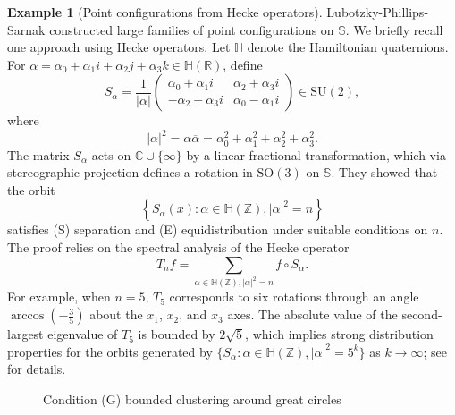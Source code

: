 \documentclass[12pt,reqno]{amsart}
\newcommand{\C}{\mathbb{C}}
\newcommand{\Hb}{\mathbb{H}}
\newcommand{\ol}{\overline}
\newcommand{\R}{\mathbb{R}}
\newcommand{\Sb}{\mathbb{S}}
\newcommand{\SO}{\mathrm{SO}}
\newcommand{\SU}{\mathrm{SU}}
\newcommand{\Z}{\mathbb{Z}}
\theoremstyle{plain}
\theoremstyle{definition}
\newtheorem*{ex}{Example}
\theoremstyle{remark}
\numberwithin{equation}{section}
\begin{document}
\begin{ex}[Point configurations from Hecke operators]
Lubotzky-Phillips-Sarnak \cite{LPS1, LPS2} constructed large families of point configurations on $\Sb$. We briefly recall one approach using Hecke operators. Let $\Hb$ denote the Hamiltonian quaternions. For $\alpha=\alpha_0+\alpha_1 i+\alpha_2j+\alpha_3k\in\Hb(\R)$, define
$$S_\alpha=\frac{1}{|\alpha|}\begin{pmatrix}
\alpha_0+\alpha_1i & \alpha_2+\alpha_3i\\
-\alpha_2+\alpha_3i & \alpha_0-\alpha_1i\end{pmatrix}\in\SU(2),$$
where
$$|\alpha|^2=\alpha\ol\alpha=\alpha_0^2+\alpha_1^2+\alpha_2^2+\alpha_3^2.$$
The matrix $S_\alpha$ acts on $\C\cup\{\infty\}$ by a linear fractional transformation, which via stereographic projection defines a rotation in $\SO(3)$ on $\Sb$. They showed that the orbit
$$\left\{S_\alpha(x):\alpha\in\Hb(\Z),|\alpha|^2=n\right\}$$
satisfies (S) separation and (E) equidistribution under suitable conditions on $n$. The proof relies on the spectral analysis of the Hecke operator
\begin{equation}\label{eq:Hecke}
T_nf=\sum_{\alpha\in\Hb(\Z),|\alpha|^2=n}f\circ S_\alpha.
\end{equation}
For example, when $n=5$, $T_5$ corresponds to six rotations through an angle $\arccos(-\frac35)$ about the $x_1$, $x_2$, and $x_3$ axes. The absolute value of the second-largest eigenvalue of $T_5$ is bounded by $2\sqrt5$, which implies strong distribution properties for the orbits generated by $\{S_\alpha:\alpha\in\Hb(\Z),|\alpha|^2=5^k\}$ as $k\to\infty$; see \cite{LPS1, LPS2} for details.
\end{ex}

\begin{figure}[H]
\caption{Condition (G) bounded clustering around great circles}
\label{fig:pt}
\end{figure}
\end{document}
